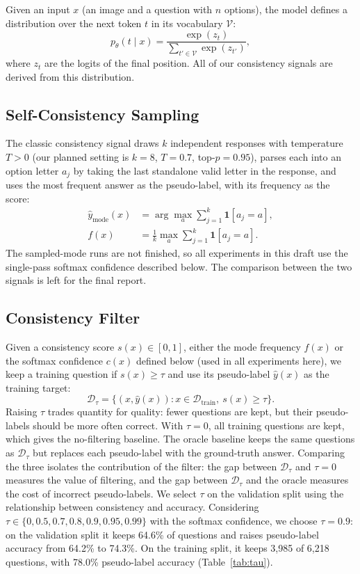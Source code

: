 \documentclass{article}
\begin{document}
Given an input $x$ (an image and a question with $n$ options), the model defines a distribution over the next token $t$ in its vocabulary $\mathcal{V}$:
\begin{equation}
p_\theta(t \mid x) = \frac{\exp(z_t)}{\sum_{t' \in \mathcal{V}} \exp(z_{t'})},
\end{equation}
where $z_t$ are the logits of the final position. All of our consistency signals are derived from this distribution.

\subsection{Self-Consistency Sampling}
The classic consistency signal draws $k$ independent responses with temperature $T > 0$ (our planned setting is $k = 8$, $T = 0.7$, top-$p = 0.95$), parses each into an option letter $a_j$ by taking the last standalone valid letter in the response, and uses the most frequent answer as the pseudo-label, with its frequency as the score:
\begin{align}
\hat{y}_{\text{mode}}(x) &= \arg\max_{a} \sum_{j=1}^{k} \mathbf{1}[a_j = a], \\
f(x) &= \frac{1}{k} \max_{a} \sum_{j=1}^{k} \mathbf{1}[a_j = a].
\end{align}
The sampled-mode runs are not finished, so all experiments in this draft use the single-pass softmax confidence described below. The comparison between the two signals is left for the final report.

\subsection{Consistency Filter}
Given a consistency score $s(x) \in [0, 1]$, either the mode frequency $f(x)$ or the softmax confidence $c(x)$ defined below (used in all experiments here), we keep a training question if $s(x) \geq \tau$ and use its pseudo-label $\hat{y}(x)$ as the training target:
\begin{equation}
\mathcal{D}_\tau = \{(x, \hat{y}(x)) : x \in \mathcal{D}_{\text{train}},\ s(x) \geq \tau\}.
\end{equation}
Raising $\tau$ trades quantity for quality: fewer questions are kept, but their pseudo-labels should be more often correct. With $\tau = 0$, all training questions are kept, which gives the no-filtering baseline. The oracle baseline keeps the same questions as $\mathcal{D}_\tau$ but replaces each pseudo-label with the ground-truth answer. Comparing the three isolates the contribution of the filter: the gap between $\mathcal{D}_\tau$ and $\tau = 0$ measures the value of filtering, and the gap between $\mathcal{D}_\tau$ and the oracle measures the cost of incorrect pseudo-labels. We select $\tau$ on the validation split using the relationship between consistency and accuracy. Considering $\tau \in \{0, 0.5, 0.7, 0.8, 0.9, 0.95, 0.99\}$ with the softmax confidence, we choose $\tau = 0.9$: on the validation split it keeps 64.6\% of questions and raises pseudo-label accuracy from 64.2\% to 74.3\%. On the training split, it keeps 3,985 of 6,218 questions, with 78.0\% pseudo-label accuracy (Table~\ref{tab:tau}).
\end{document}

